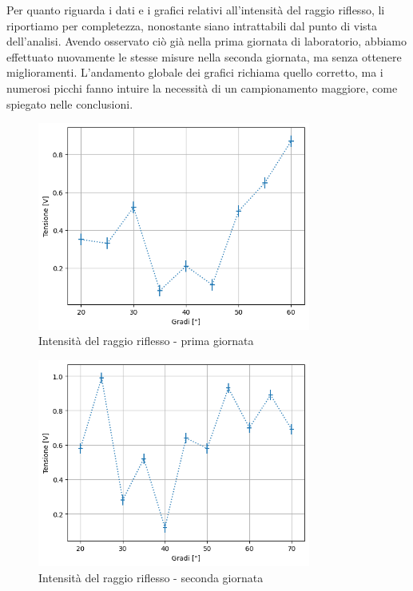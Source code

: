 \documentclass[letterpaper,12pt]{article}
\begin{document}
Per quanto riguarda i dati e i grafici relativi all'intensità del raggio riflesso, li riportiamo per completezza,
nonostante siano intrattabili dal punto di vista dell'analisi. Avendo osservato ciò già nella prima giornata di
laboratorio, abbiamo effettuato nuovamente le stesse misure nella seconda giornata, ma senza ottenere miglioramenti.
L'andamento globale dei grafici richiama quello corretto, ma i numerosi picchi fanno intuire la necessità di un
campionamento maggiore, come spiegato nelle conclusioni.\\

\begin{figure}[h!]
	\centering
	\includegraphics[width = 0.8\textwidth]{riflesso1.png}
	\caption{Intensità del raggio riflesso - prima giornata}
	\label{fig:riflesso1}
\end{figure}

\begin{figure}[h!]
	\centering
	\includegraphics[width = 0.8\textwidth]{riflesso2.png}
	\caption{Intensità del raggio riflesso - seconda giornata}
	\label{fig:riflesso2}
\end{figure}
\end{document}
